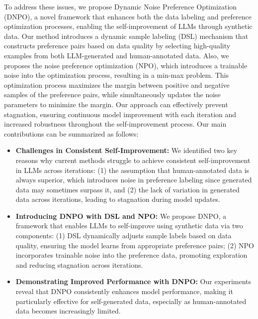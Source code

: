 To address these issues, we propose Dynamic Noise Preference Optimization (DNPO), a novel framework that enhances both the data labeling and preference optimization processes, enabling the self-improvement of LLMs through synthetic data. Our method introduces a dynamic sample labeling (DSL) mechanism that constructs preference pairs based on data quality by selecting high-quality examples from both LLM-generated and human-annotated data. Also, we proposes the noise preference optimization (NPO), which introduces a trainable noise into the optimization process, resulting in a min-max problem.
This optimization process maximizes the margin between positive and negative samples of the preference pairs, while simultaneously updates the noise parameters to minimize the margin.
Our approach can effectively prevent stagnation, ensuring continuous model improvement with each iteration and increased robustness throughout the self-improvement process.
Our main contributions can be summarized as follows:
\begin{itemize}[leftmargin=8pt]
\item \textbf{Challenges in Consistent Self-Improvement:} We identified two key reasons why current methods struggle to achieve consistent self-improvement in LLMs across iterations: (1) the assumption that human-annotated data is always superior, which introduces noise in preference labeling since generated data may sometimes surpass it, and (2) the lack of variation in generated data across iterations, leading to stagnation during model updates.

\item \textbf{Introducing DNPO with DSL and NPO:} We propose DNPO, a framework that enables LLMs to self-improve using synthetic data via two components: (1) DSL dynamically adjusts sample labels based on data quality, ensuring the model learns from appropriate preference pairs; (2) NPO incorporates trainable noise into the preference data, promoting exploration and reducing stagnation across iterations.

\item \textbf{Demonstrating Improved Performance with DNPO:} Our experiments reveal that DNPO consistently enhances model performance, making it particularly effective for self-generated data, especially as human-annotated data becomes increasingly limited.
\end{itemize}



















